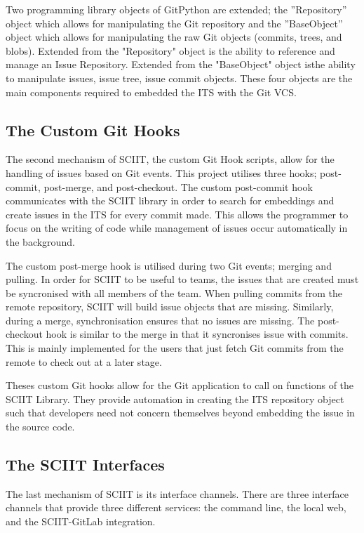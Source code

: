 \documentclass{mproj}
\begin{document}
Two programming library objects of GitPython are extended; the ”Repository” object which allows for manipulating the Git repository and the ”BaseObject” object which allows for manipulating the raw Git objects (commits, trees, and blobs). Extended from the "Repository" object is the ability to reference and manage an Issue Repository. Extended from the "BaseObject" object isthe ability to manipulate issues, issue tree, issue commit objects. These four objects are the main components required to embedded the ITS with the Git VCS.


\subsection{The Custom Git Hooks}

The second mechanism of SCIIT, the custom Git Hook scripts, allow for the handling of issues based on Git events. This project utilises three hooks; post-commit, post-merge, and post-checkout. The custom post-commit hook communicates with the SCIIT library in order to search for embeddings and create issues in the ITS for every commit made. This allows the programmer to focus on the writing of code while management of issues occur automatically in the background. 

The custom post-merge hook is utilised during two Git events; merging and pulling. In order for SCIIT to be useful to teams, the issues that are created must be syncronised with all members of the team. When pulling commits from the remote repository, SCIIT will build issue objects that are missing. Similarly, during a merge, synchronisation ensures that no issues are missing. The post-checkout hook is similar to the merge in that it syncronises issue with commits. This is mainly implemented for the users that just fetch Git commits from the remote to check out at a later stage.

Theses custom Git hooks allow for the Git application to call on functions of the SCIIT Library. They provide automation in creating the ITS repository object such that developers need not concern themselves beyond embedding the issue in the source code. 

\subsection{The SCIIT Interfaces}

The last mechanism of SCIIT is its interface channels. There are three interface channels that provide three different services: the command line, the local web, and the SCIIT-GitLab integration.
\end{document}
